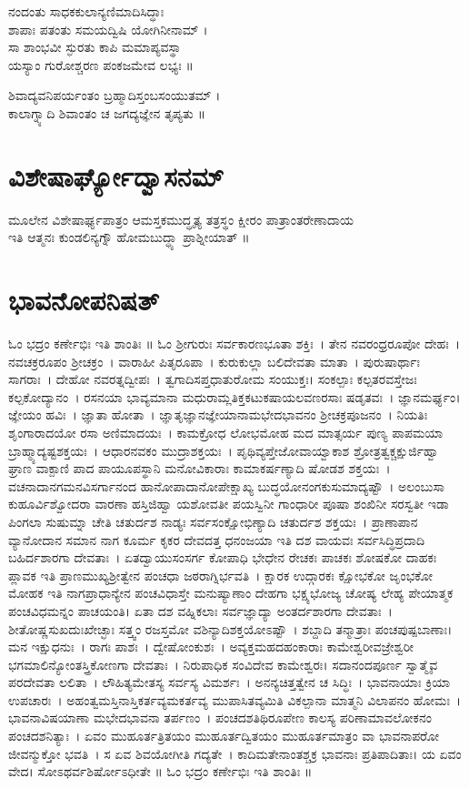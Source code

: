 ನಂದಂತು ಸಾಧಕಕುಲಾನ್ಯಣಿಮಾದಿಸಿದ್ಧಾಃ\\
ಶಾಪಾಃ ಪತಂತು ಸಮಯದ್ವಿಷಿ ಯೋಗಿನೀನಾಮ್ ।\\
ಸಾ ಶಾಂಭವೀ ಸ್ಫುರತು ಕಾಪಿ ಮಮಾಪ್ಯವಸ್ಥಾ\\
ಯಸ್ಯಾಂ ಗುರೋಶ್ಚರಣ ಪಂಕಜಮೇವ ಲಭ್ಯಃ ॥

ಶಿವಾದ್ಯವನಿಪರ್ಯಂತಂ ಬ್ರಹ್ಮಾದಿಸ್ತಂಬಸಂಯುತಮ್ ।\\
ಕಾಲಾಗ್ನ್ಯಾದಿ ಶಿವಾಂತಂ ಚ ಜಗದ್ಯಜ್ಞೇನ ತೃಪ್ಯತು ॥
\section{ವಿಶೇಷಾರ್ಘ್ಯೋದ್ವಾಸನಮ್}
ಮೂಲೇನ ವಿಶೇಷಾರ್ಘ್ಯಪಾತ್ರಂ ಆಮಸ್ತಕಮುದ್ಧೃತ್ಯ ತತ್ರಸ್ಥಂ ಕ್ಷೀರಂ ಪಾತ್ರಾಂತರೇಣಾದಾಯ \\
 ಇತಿ ಆತ್ಮನಃ ಕುಂಡಲಿನ್ಯಗ್ನೌ ಹೋಮಬುದ್ಧ್ಯಾ  ಪ್ರಾಶ್ನೀಯಾತ್ ॥

\section{ಭಾವನೋಪನಿಷತ್}
ಓಂ ಭದ್ರಂ ಕರ್ಣೇಭಿಃ ಇತಿ ಶಾಂತಿಃ ॥
ಓಂ ಶ್ರೀಗುರುಃ ಸರ್ವಕಾರಣಭೂತಾ ಶಕ್ತಿಃ~। ತೇನ ನವರಂಧ್ರರೂಪೋ ದೇಹಃ~। ನವಚಕ್ರರೂಪಂ ಶ್ರೀಚಕ್ರಂ~। ವಾರಾಹೀ ಪಿತೃರೂಪಾ~। ಕುರುಕುಲ್ಲಾ ಬಲಿದೇವತಾ ಮಾತಾ~। ಪುರುಷಾರ್ಥಾಃ ಸಾಗರಾಃ~। ದೇಹೋ ನವರತ್ನದ್ವೀಪಃ~। ತ್ವಗಾದಿಸಪ್ತಧಾತುರೋಮ ಸಂಯುಕ್ತಃ। ಸಂಕಲ್ಪಾಃ ಕಲ್ಪತರವಸ್ತೇಜಃ ಕಲ್ಪಕೋ\-ದ್ಯಾನಂ~। ರಸನಯಾ ಭಾವ್ಯಮಾನಾ ಮಧುರಾಮ್ಲತಿಕ್ತಕಟುಕಷಾಯಲವಣರಸಾಃ ಷಡೃತವಃ~। ಜ್ಞಾನಮರ್ಘ್ಯಂ। ಜ್ಞೇಯಂ ಹವಿಃ~। ಜ್ಞಾತಾ ಹೋತಾ~। ಜ್ಞಾತೃಜ್ಞಾನಜ್ಞೇಯಾನಾಮಭೇದಭಾವನಂ ಶ್ರೀಚಕ್ರಪೂಜನಂ~। ನಿಯತಿಃ ಶೃಂಗಾರಾದಯೋ ರಸಾ ಅಣಿಮಾದಯಃ~। ಕಾಮಕ್ರೋಧ ಲೋಭಮೋಹ ಮದ ಮಾತ್ಸರ್ಯ ಪುಣ್ಯ ಪಾಪಮಯಾ ಬ್ರಾಹ್ಮ್ಯಾದ್ಯಷ್ಟಶಕ್ತಯಃ~। ಆಧಾರನವಕಂ ಮುದ್ರಾಶಕ್ತಯಃ~। ಪೃಥಿವ್ಯಪ್ತೇಜೋವಾಯ್ವಾಕಾಶ ಶ್ರೋತ್ರತ್ವಕ್ಚಕ್ಷುರ್ಜಿಹ್ವಾ ಘ್ರಾಣ ವಾಕ್ಪಾಣಿ ಪಾದ ಪಾಯೂಪಸ್ಥಾನಿ ಮನೋವಿಕಾರಾಃ ಕಾಮಾಕರ್ಷಣ್ಯಾದಿ ಷೋಡಶ ಶಕ್ತಯಃ~। ವಚನಾದಾನಗಮನವಿಸರ್ಗಾನಂದ ಹಾನೋಪಾದಾನೋಪೇಕ್ಷಾಖ್ಯ ಬುದ್ಧಯೋನಂಗಕುಸುಮಾದ್ಯಷ್ಟೌ~। ಅಲಂಬುಸಾ ಕುಹೂರ್ವಿಶ್ವೋದರಾ ವಾರಣಾ ಹಸ್ತಿಜಿಹ್ವಾ ಯಶೋವತೀ ಪಯಸ್ವಿನೀ ಗಾಂಧಾರೀ ಪೂಷಾ ಶಂಖಿನೀ ಸರಸ್ವತೀ ಇಡಾ ಪಿಂಗಲಾ ಸುಷುಮ್ನಾ ಚೇತಿ ಚತುರ್ದಶ ನಾಡ್ಯಃ ಸರ್ವಸಂಕ್ಷೋಭಿಣ್ಯಾದಿ ಚತುರ್ದಶ ಶಕ್ತಯಃ~। ಪ್ರಾಣಾಪಾನ ವ್ಯಾನೋದಾನ ಸಮಾನ ನಾಗ ಕೂರ್ಮ ಕೃಕರ ದೇವದತ್ತ ಧನಂಜಯಾ ಇತಿ ದಶ ವಾಯವಃ ಸರ್ವಸಿದ್ಧಿಪ್ರದಾದಿ ಬಹಿರ್ದಶಾರಗಾ ದೇವತಾಃ~। ಏತದ್ವಾಯುಸಂಸರ್ಗ ಕೋಪಾಧಿ ಭೇಧೇನ ರೇಚಕಃ ಪಾಚಕಃ ಶೋಷಕೋ ದಾಹಕಃ ಪ್ಲಾವಕ ಇತಿ ಪ್ರಾಣಮುಖ್ಯಶ್ರೀತ್ವೇನ ಪಂಚಧಾ ಜಠರಾಗ್ನಿರ್ಭವತಿ~। ಕ್ಷಾರಕ ಉದ್ಗಾರಕಃ ಕ್ಷೋಭಕೋ ಜೃಂಭಕೋ ಮೋಹಕ ಇತಿ ನಾಗಪ್ರಾಧಾನ್ಯೇನ ಪಂಚವಿಧಾಸ್ತೇ ಮನುಷ್ಯಾಣಾಂ ದೇಹಗಾ ಭಕ್ಷ್ಯಭೋಜ್ಯ ಚೋಷ್ಯ ಲೇಹ್ಯ ಪೇಯಾತ್ಮಕ ಪಂಚವಿಧಮನ್ನಂ ಪಾಚಯಂತಿ। ಏತಾ ದಶ ವಹ್ನಿಕಲಾಃ ಸರ್ವಜ್ಞಾದ್ಯಾ ಅಂತರ್ದಶಾರಗಾ ದೇವತಾಃ~। ಶೀತೋಷ್ಣಸುಖದುಃಖೇಚ್ಛಾಃ ಸತ್ತ್ವಂ ರಜಸ್ತಮೋ ವಶಿನ್ಯಾದಿಶಕ್ತಯೋಽಷ್ಟೌ~। ಶಬ್ದಾದಿ ತನ್ಮಾತ್ರಾಃ ಪಂಚಪುಷ್ಪಬಾಣಾಃ। ಮನ ಇಕ್ಷುಧನುಃ~। ರಾಗಃ ಪಾಶಃ~। ದ್ವೇಷೋಂಕುಶಃ~। ಅವ್ಯಕ್ತಮಹದಹಂಕಾರಾಃ ಕಾಮೇಶ್ವರೀವಜ್ರೇಶ್ವರೀ ಭಗಮಾಲಿನ್ಯೋಂತಸ್ತ್ರಿಕೋಣಗಾ ದೇವತಾಃ~। ನಿರುಪಾಧಿಕ ಸಂವಿದೇವ ಕಾಮೇಶ್ವರಃ। ಸದಾನಂದಪೂರ್ಣ ಸ್ವಾತ್ಮೈವ ಪರದೇವತಾ ಲಲಿತಾ~। ಲೌಹಿತ್ಯಮೇತಸ್ಯ ಸರ್ವಸ್ಯ ವಿಮರ್ಶಃ~। ಅನನ್ಯಚಿತ್ತತ್ವೇನ ಚ ಸಿದ್ಧಿಃ~। ಭಾವನಾಯಾಃ ಕ್ರಿಯಾ ಉಪಚಾರಃ~। ಅಹಂತ್ವಮಸ್ತಿನಾಸ್ತಿಕರ್ತವ್ಯಮಕರ್ತವ್ಯ ಮುಪಾಸಿತವ್ಯಮಿತಿ ವಿಕಲ್ಪಾನಾ ಮಾತ್ಮನಿ ವಿಲಾಪನಂ ಹೋಮಃ~। ಭಾವನಾವಿಷಯಾಣಾ ಮಭೇದಭಾವನಾ ತರ್ಪಣಂ~। ಪಂಚದಶತಿಥಿರೂಪೇಣ ಕಾಲಸ್ಯ ಪರಿಣಾಮಾವಲೋಕನಂ ಪಂಚದಶನಿತ್ಯಾಃ~। ಏವಂ ಮುಹೂರ್ತತ್ರಿತಯಂ ಮುಹೂರ್ತದ್ವಿತಯಂ ಮುಹೂರ್ತಮಾತ್ರಂ ವಾ ಭಾವನಾಪರೋ ಜೀವನ್ಮುಕ್ತೋ ಭವತಿ~। ಸ ಏವ ಶಿವಯೋಗೀತಿ ಗದ್ಯತೇ~। ಕಾದಿಮತೇನಾಂತಶ್ಚಕ್ರ ಭಾವನಾಃ ಪ್ರತಿಪಾದಿತಾಃ। ಯ ಏವಂ ವೇದ। ಸೋಽಥರ್ವಶಿರ್ಷೋಽಧೀತೇ ॥ ಓಂ ಭದ್ರಂ ಕರ್ಣೇಭಿಃ ಇತಿ ಶಾಂತಿಃ ॥
